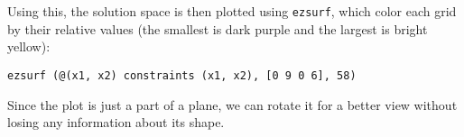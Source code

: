 \documentclass[a4paper,12pt]{article}
\begin{document}
\begin{enumerate}[(a)]
    Using this, the solution space is then plotted using \verb|ezsurf|,
    which color each grid by their relative values (the smallest is dark purple
    and the largest is bright yellow):
\begin{verbatim}
ezsurf (@(x1, x2) constraints (x1, x2), [0 9 0 6], 58)
\end{verbatim}
\pagebreak

    Since the plot is just a part of a plane, we can rotate it for a better view
    without losing any information about its shape.

    \scalebox{0.69}{}
\end{enumerate}
\end{document}
